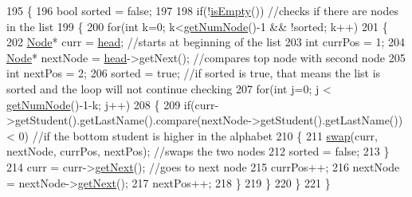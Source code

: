 \begin{DoxyCode}
195 \{
196    \textcolor{keywordtype}{bool} sorted = \textcolor{keyword}{false};
197 
198    \textcolor{keywordflow}{if}(!\hyperlink{classLinkedList_a1b28b1e19e5aa68f3d89352e307928f6}{isEmpty}()) \textcolor{comment}{//checks if there are nodes in the list                                           
                                                                                                              }
199    \{
200       \textcolor{keywordflow}{for}(\textcolor{keywordtype}{int} k=0; k<\hyperlink{classLinkedList_ae04dbbcae32f8fb03dce3e174854981f}{getNumNode}()-1 && !sorted; k++)
201       \{
202          \hyperlink{classNode}{Node}* curr = \hyperlink{classLinkedList_a35e09287e2d2943707b011208e7a8ed2}{head}; \textcolor{comment}{//starts at beginning of the list                                      
                                                                                                               }
203          \textcolor{keywordtype}{int} currPos = 1;
204          \hyperlink{classNode}{Node}* nextNode = \hyperlink{classLinkedList_a35e09287e2d2943707b011208e7a8ed2}{head}->getNext(); \textcolor{comment}{//compares top node with second node                    
                                                                                                               }
205          \textcolor{keywordtype}{int} nextPos = 2;
206          sorted = \textcolor{keyword}{true}; \textcolor{comment}{//if sorted is true, that means the list is sorted and the loop will not continue
       checking                                                                                          }
207          \textcolor{keywordflow}{for}(\textcolor{keywordtype}{int} j=0; j < \hyperlink{classLinkedList_ae04dbbcae32f8fb03dce3e174854981f}{getNumNode}()-1-k; j++)
208          \{
209             \textcolor{keywordflow}{if}(curr->getStudent().getLastName().compare(nextNode->getStudent().getLastName()) < 0) \textcolor{comment}{//if the
       bottom student is higher in the alphabet}
210             \{
211                \hyperlink{classLinkedList_adea39e4b5d8f3fcb608c11f7746790ed}{swap}(curr, nextNode, currPos, nextPos); \textcolor{comment}{//swaps the two nodes                           
                                                                                                           }
212                sorted = \textcolor{keyword}{false};
213             \}
214             curr = curr->\hyperlink{classNode_af8f2d178f274dd254e6e1965971f0fd0}{getNext}(); \textcolor{comment}{//goes to next node                                             
                                                                                                              }
215             currPos++;
216             nextNode = nextNode->\hyperlink{classNode_af8f2d178f274dd254e6e1965971f0fd0}{getNext}();
217             nextPos++;
218          \}
219       \}
220    \}
221 \}
\end{DoxyCode}


